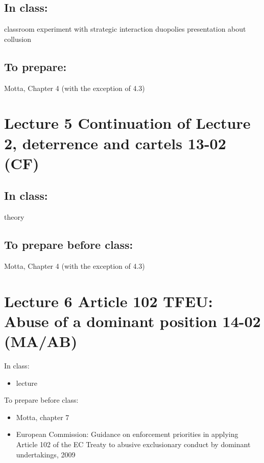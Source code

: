 \documentclass[]{book}
\providecommand{\tightlist}{%
  \setlength{\itemsep}{0pt}\setlength{\parskip}{0pt}}
\begin{document}
\subsection{In class:}\label{in-class-2}

classroom experiment with strategic interaction duopolies presentation
about collusion

\subsection{To prepare:}\label{to-prepare}

Motta, Chapter 4 (with the exception of 4.3)

\section{Lecture 5 Continuation of Lecture 2, deterrence and cartels
13-02
(CF)}\label{lecture-5-continuation-of-lecture-2-deterrence-and-cartels-13-02-cf}

\subsection{In class:}\label{in-class-3}

theory

\subsection{To prepare before class:}\label{to-prepare-before-class-2}

Motta, Chapter 4 (with the exception of 4.3)

\section{Lecture 6 Article 102 TFEU: Abuse of a dominant position 14-02
(MA/AB)}\label{lecture-6-article-102-tfeu-abuse-of-a-dominant-position-14-02-maab}

In class:

\begin{itemize}
\tightlist
\item
  lecture
\end{itemize}

To prepare before class:

\begin{itemize}
\tightlist
\item
  Motta, chapter 7
\item
  European Commission: Guidance on enforcement priorities in applying
  Article 102 of the EC Treaty to abusive exclusionary conduct by
  dominant undertakings, 2009
\end{itemize}
\end{document}
